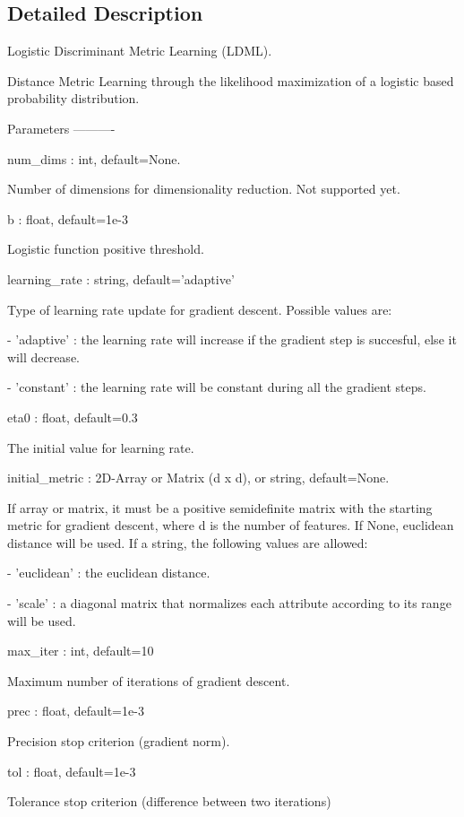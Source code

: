 \subsection{Detailed Description}
\begin{DoxyVerb}Logistic Discriminant Metric Learning (LDML).

Distance Metric Learning through the likelihood maximization of a logistic based probability distribution.

Parameters
----------

num_dims : int, default=None.

    Number of dimensions for dimensionality reduction. Not supported yet.

b : float, default=1e-3

    Logistic function positive threshold.

learning_rate : string, default='adaptive'

    Type of learning rate update for gradient descent. Possible values are:

    - 'adaptive' : the learning rate will increase if the gradient step is succesful, else it will decrease.

    - 'constant' : the learning rate will be constant during all the gradient steps.

eta0 : float, default=0.3

    The initial value for learning rate.

initial_metric : 2D-Array or Matrix (d x d), or string, default=None.

    If array or matrix, it must be a positive semidefinite matrix with the starting metric for gradient descent, where d is the number of features.
    If None, euclidean distance will be used. If a string, the following values are allowed:

    - 'euclidean' : the euclidean distance.

    - 'scale' : a diagonal matrix that normalizes each attribute according to its range will be used.

max_iter : int, default=10

    Maximum number of iterations of gradient descent.

prec : float, default=1e-3

    Precision stop criterion (gradient norm).

tol : float, default=1e-3

    Tolerance stop criterion (difference between two iterations)


\end{DoxyVerb}
